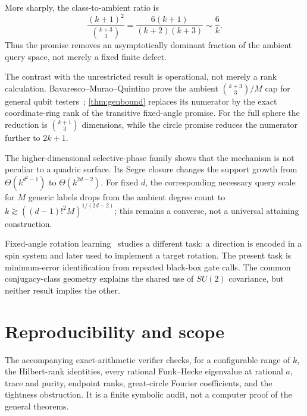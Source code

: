 \documentclass[11pt]{article}
\theoremstyle{definition}
\theoremstyle{remark}
\begin{document}
More sharply, the class-to-ambient ratio is
\begin{equation}
 \frac{(k+1)^2}{\binom{k+3}{3}}
 =\frac{6(k+1)}{(k+2)(k+3)}\sim\frac6k.
\end{equation}
Thus the promise removes an asymptotically dominant fraction of the ambient
query space, not merely a fixed finite defect.

The contrast with the unrestricted result is operational, not merely a rank
calculation.  Bavaresco--Murao--Quintino prove the ambient
$\binom{k+3}{3}/M$ cap for general qubit testers~\cite{bavaresco2022};
\cref{thm:genbound} replaces its numerator by the exact coordinate-ring rank
of the transitive fixed-angle promise.  For the full sphere the reduction is
$\binom{k+1}{3}$ dimensions, while the circle promise reduces the numerator
further to $2k+1$.

The higher-dimensional selective-phase family shows that the mechanism is
not peculiar to a quadric surface.  Its Segre closure changes the support
growth from $\Theta(k^{d^2-1})$ to $\Theta(k^{2d-2})$.  For fixed $d$, the
corresponding necessary query scale for $M$ generic labels drops from the
ambient degree count to
$k\gtrsim((d-1)!^2M)^{1/(2d-2)}$; this remains a converse, not a universal
attaining construction.

Fixed-angle rotation learning~\cite{mochiribella2019} studies a different
task: a direction is encoded in a spin system and later used to implement a
target rotation.  The present task is minimum-error identification from
repeated black-box gate calls.  The common conjugacy-class geometry explains
the shared use of $SU(2)$ covariance, but neither result implies the other.

\section{Reproducibility and scope}

The accompanying exact-arithmetic verifier checks, for a configurable range
of $k$, the Hilbert-rank identities, every rational Funk--Hecke eigenvalue at
rational $a$, trace and purity, endpoint ranks, great-circle Fourier
coefficients, and the tightness obstruction.  It is a finite symbolic audit,
not a computer proof of the general theorems.
\end{document}
